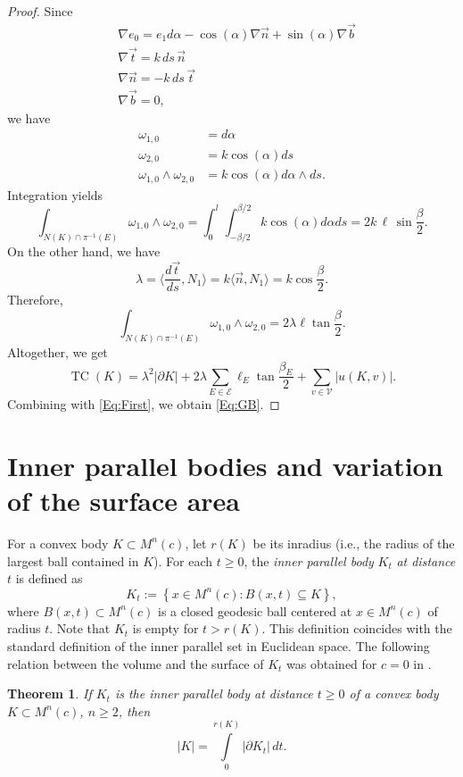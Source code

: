 \documentclass[12pt]{amsart}
\DeclareMathOperator{\TC}{\mathrm{TC}}
\renewcommand{\ge}{\geqslant}
\theoremstyle{theorem}
\newtheorem{theorem}{Theorem}[section]
\theoremstyle{Intro}
\theoremstyle{definition}
\theoremstyle{remark}
\theoremstyle{claim}
\numberwithin{equation}{section}
\begin{document}
\begin{proof}
Since
\begin{align*}
&\nabla e_0=e_1 d\alpha-\cos(\alpha)\nabla\vec n +\sin(\alpha)\nabla\vec b\\
&\nabla \vec t=k\, ds\,\vec n\\
&\nabla \vec n=-k\, ds\,\vec t\\
&\nabla \vec b=0,
\end{align*}
we have
\begin{align*}
    \omega_{1,0}&=d\alpha\\
    \omega_{2,0}&=k\cos(\alpha)ds\\
    \omega_{1,0}\wedge \omega_{2,0}&=k\cos(\alpha) d\alpha\wedge ds.
\end{align*}
Integration yields
\[
\int_{N(K)\cap\pi^{-1}(E)} \omega_{1,0}\wedge\omega_{2,0} =\int_0^l\int_{-\beta/2}^{\beta/2} k\cos(\alpha)d\alpha ds=2k\, \ell\,\sin\frac\beta2.
\]
On the other hand, we have 
\[
\lambda=\langle \frac{d\vec t}{ds}, N_1\rangle=k\langle\vec n,N_1\rangle = k\cos\frac\beta2.
\]
Therefore,
\[
\int_{N(K)\cap\pi^{-1}(E)} \omega_{1,0}\wedge\omega_{2,0}=2\lambda \ell \tan\frac\beta2.
\]
Altogether, we get
\[
\TC(K)=\lambda^2|\partial K|+2\lambda \sum_{E\in \mathcal E} \ell_E\tan \frac{\beta_E}2 + \sum_{v\in \mathcal V} \left|u(K,v)\right|.
\]
Combining with \eqref{Eq:First}, we obtain \eqref{Eq:GB}.
\end{proof}



\section{Inner parallel bodies and variation of the surface area}
\label{Sec:Derivative}

For a convex body $K \subset M^n(c)$, let $r(K)$ be its inradius (i.e., the radius of the largest ball contained in $K$). For each $t\geq0$,  the \emph{inner parallel body} $K_t$ \emph{at distance $t$} is defined as 
\[
K_t := \left\{x \in M^n(c) : B(x,t) \subseteq K\right\},
\]
where $B(x,t) \subset M^n(c)$ is a closed geodesic ball centered at $x \in M^n(c)$ of radius $t$.  Note that $K_t$ is empty for $t>r(K)$. This definition coincides with the standard definition of the inner parallel set in Euclidean space. The following relation between the volume and the surface of $K_t$ was obtained for $c=0$ in \cite{matheron}.

\begin{theorem}
\label{Eq:Der}
    If $K_t$ is the inner parallel body at distance $t \ge 0$ of a convex body $K \subset M^n(c)$, $n \ge 2$, then
    \begin{equation}
    \label{Eq:Volume}
    |K| = \int \limits_0^{r(K)} |\partial K_t| \, dt.
\end{equation}
\end{theorem}
\end{document}
